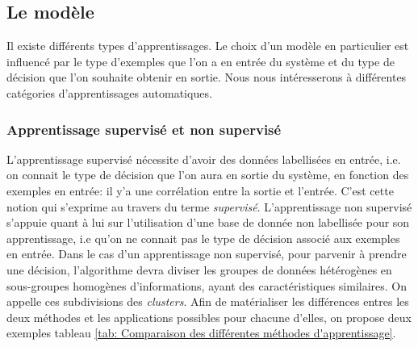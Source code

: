 \subsection{Le modèle}
\label{Le Machine Learning: Généralités sur le Machine Learning: Le modèle}
Il existe différents types d'apprentissages. Le choix d'un modèle en particulier est influencé par le type d'exemples que l'on a en entrée du système et du type de décision que l'on souhaite obtenir en sortie. Nous nous intéresserons à différentes catégories d'apprentissages automatiques.

\subsubsection{Apprentissage supervisé et non supervisé} 
\label{Le Machine Learning: Généralités sur le Machine Learning: Le modèle: apprentissage supervisé et non supervisé}
L'apprentissage supervisé nécessite d'avoir des données labellisées en entrée, i.e. on connait le type de décision que l'on aura en sortie du système, en fonction des exemples en entrée: il y'a une corrélation entre la sortie et l'entrée. C'est cette notion qui s'exprime au travers du terme \emph{supervisé}. 
L'apprentissage non supervisé s'appuie quant à lui sur l'utilisation d'une base de donnée non labellisée pour son apprentissage, i.e qu'on ne connait pas le type de décision associé aux exemples en entrée. Dans le cas d'un apprentissage non supervisé, pour parvenir à prendre une décision, l'algorithme devra diviser les groupes de données hétérogènes en sous-groupes homogènes d'informations, ayant des caractéristiques similaires. On appelle ces subdivisions des \emph{clusters}.
Afin de matérialiser les différences entres les deux méthodes et les applications possibles pour chacune d'elles, on propose deux exemples tableau \ref {tab: Comparaison des différentes méthodes d'apprentissage}.

